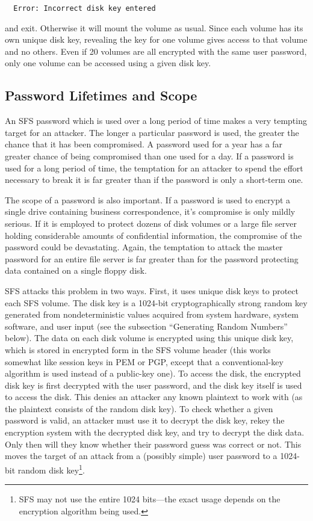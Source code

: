 {\tt \verb|  |Error: Incorrect disk key entered}

and exit.  Otherwise it will mount the volume as usual.  Since each volume has
its own unique disk key, revealing the key for one volume gives access to that
volume and no others.  Even if 20 volumes are all encrypted with the same user
password, only one volume can be accessed using a given disk key.


\subsection{Password Lifetimes and Scope}

An SFS password which is used over a long period of time makes a very tempting
target for an attacker.  The longer a particular password is used, the greater
the chance that it has been compromised.  A password used for a year has a far
greater chance of being compromised than one used for a day.  If a password is
used for a long period of time, the temptation for an attacker to spend the
effort necessary to break it is far greater than if the password is only a
short-term one.

The scope of a password is also important.  If a password is used to encrypt a
single drive containing business correspondence, it's compromise is only mildly
serious.  If it is employed to protect dozens of disk volumes or a large file
server holding considerable amounts of confidential information, the compromise
of the password could be devastating.  Again, the temptation to attack the
master password for an entire file server is far greater than for the password
protecting data contained on a single floppy disk.

SFS attacks this problem in two ways.  First, it uses unique disk keys to
protect each SFS volume.  The disk key is a 1024-bit cryptographically strong
random key generated from nondeterministic values acquired from system
hardware, system software, and user input (see the subsection ``Generating
Random Numbers'' below).  The data on each disk volume is encrypted using this
unique disk key, which is stored in encrypted form in the SFS volume header
(this works somewhat like session keys in PEM or PGP, except that a
conventional-key algorithm is used instead of a public-key one).  To access the
disk, the encrypted disk key is first decrypted with the user password, and the
disk key itself is used to access the disk.  This denies an attacker any known
plaintext to work with (as the plaintext consists of the random disk key).  To
check whether a given password is valid, an attacker must use it to decrypt the
disk key, rekey the encryption system with the decrypted disk key, and try to
decrypt the disk data.  Only then will they know whether their password guess 
was correct or not.  This moves the target of an attack from a (possibly
simple) user password to a 1024-bit random disk key\footnote{
		SFS may not use the entire 1024 bits---the exact usage depends on
              	the encryption algorithm being used.
}.

